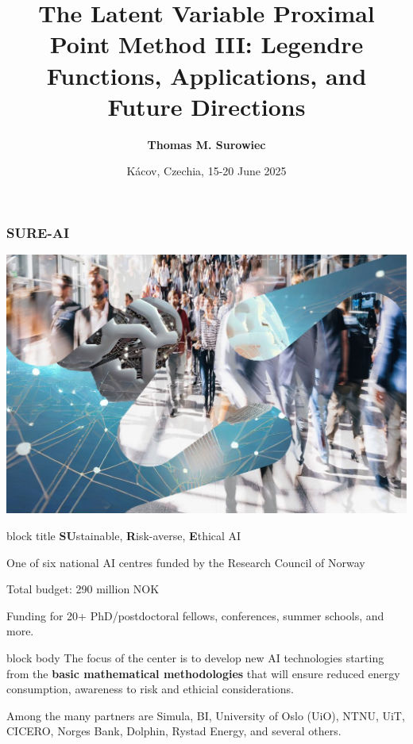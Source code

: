 \documentclass[aspectratio=169,xcolor=dvipsnames,11pt]{beamer}
\title[\quad\quad\quad LVPP Course III]{The Latent Variable Proximal Point Method III: Legendre Functions, Applications, and Future Directions
 } %
\author{\small{\bf Thomas M. Surowiec}}
\institute[T.M. Surowiec]{Department of Numerical Analysis and Scientific Computing \newline Simula Research Laboratory \newline Oslo, Norway}
\date[EMS School]{ {\footnotesize 
K\'acov, Czechia, 15-20 June 2025}}
\begin{document}
{
\frame{\titlepage}
}

\begin{frame}\frametitle{SURE-AI}
\begin{minipage}{0.45\linewidth}
  \includegraphics[width=\linewidth]{figures/ai-centres.jpeg}
\end{minipage}%
\begin{minipage}{0.47\linewidth}
\begin{beamercolorbox}[rounded=true, shadow=true, wd=\textwidth]{block title}
    \textbf{SU}stainable, \textbf{R}isk-averse, \textbf{E}thical AI\medskip

    One of six national AI centres funded by the Research Council of Norway\medskip

    Total budget: 290 million NOK \medskip
    
    Funding for  20+ PhD/postdoctoral fellows, conferences, summer schools, and more.
  \end{beamercolorbox}
\end{minipage}
\begin{beamercolorbox}[rounded=true, shadow=true, wd=\textwidth]{block body}\scriptsize
 The focus of the center is to develop new AI technologies starting from the \textbf{basic mathematical methodologies} that will ensure reduced energy consumption, awareness to risk and ethicial considerations.\medskip

Among the many partners are Simula, BI, University of Oslo (UiO), NTNU, UiT, CICERO, Norges Bank, Dolphin, Rystad Energy, and several others.
  \end{beamercolorbox}
\end{frame}
\end{document}
